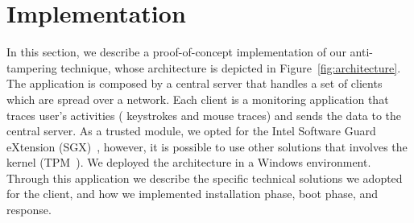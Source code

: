 \section{Implementation}
\label{sec:implementation_packing}
In this section, we describe a proof-of-concept implementation of our 
anti-tampering
technique, whose architecture is depicted in Figure~\ref{fig:architecture}.
The application is composed by a central server that handles a set of clients 
which are spread over a network.
Each client is a monitoring application that traces user's activities (\ie 
keystrokes and mouse traces) and sends the
data to the central server.
As a trusted module, we opted for the Intel Software Guard eXtension 
(SGX)~\cite{rozas2013intel}, however, it is possible to use other solutions 
that involves the kernel (\eg TPM~\cite{tpm-isoosi}).
We deployed the architecture in a Windows environment.
Through this application we describe the specific technical solutions we 
adopted for the client, and how we implemented installation phase, boot phase, 
and response. 

